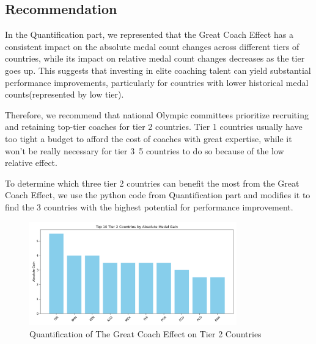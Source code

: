 \documentclass{mcmthesis}
\begin{document}

\subsection{Recommendation}

In the Quantification part, we represented that the Great Coach Effect has a consistent impact on the absolute medal count changes across different tiers of countries, while its impact on relative medal count changes decreases as the tier goes up. This suggests that investing in elite coaching talent can yield substantial performance improvements, particularly for countries with lower historical medal counts(represented by low tier).

Therefore, we recommend that national Olympic committees prioritize recruiting and retaining top-tier coaches for tier 2 countries. Tier 1 countries usually have too tight a budget to afford the cost of coaches with great expertise, while it won't be really necessary for tier 3~5 countries to do so because of the low relative effect.

To determine which three tier 2 countries can benefit the most from the Great Coach Effect, we use the python code from Quantification part and modifies it to find the 3 countries with the highest potential for performance improvement. 

\begin{figure}[htbp]
    \centering
    \includegraphics[width=0.8\textwidth]{pics/tier2_top10_absolute_gain.png}
    \caption{Quantification of The Great Coach Effect on Tier 2 Countries}
\end{figure}
\end{document}

